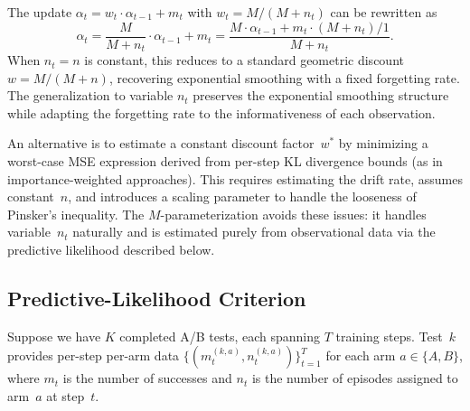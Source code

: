 \documentclass{article}
\theoremstyle{plain}
\theoremstyle{definition}
\theoremstyle{remark}
\begin{document}
The update $\alpha_t = w_t \cdot \alpha_{t-1} + m_t$ with $w_t = M/(M + n_t)$ can be rewritten as
\begin{equation}
    \alpha_t = \frac{M}{M + n_t} \cdot \alpha_{t-1} + m_t = \frac{M \cdot \alpha_{t-1} + m_t \cdot (M + n_t) / 1}{M + n_t}.
\end{equation}
When $n_t = n$ is constant, this reduces to a standard geometric discount $w = M/(M+n)$, recovering exponential smoothing with a fixed forgetting rate. The generalization to variable $n_t$ preserves the exponential smoothing structure while adapting the forgetting rate to the informativeness of each observation.

An alternative is to estimate a constant discount factor~$w^*$ by minimizing a worst-case MSE expression derived from per-step KL divergence bounds (as in importance-weighted approaches). This requires estimating the drift rate, assumes constant~$n$, and introduces a scaling parameter to handle the looseness of Pinsker's inequality. The $M$-parameterization avoids these issues: it handles variable~$n_t$ naturally and is estimated purely from observational data via the predictive likelihood described below.

\subsection{Predictive-Likelihood Criterion}

Suppose we have $K$ completed A/B tests, each spanning $T$ training steps. Test~$k$ provides per-step per-arm data $\{(m_t^{(k,a)}, n_t^{(k,a)})\}_{t=1}^T$ for each arm $a \in \{A, B\}$, where $m_t$ is the number of successes and $n_t$ is the number of episodes assigned to arm~$a$ at step~$t$.
\end{document}
